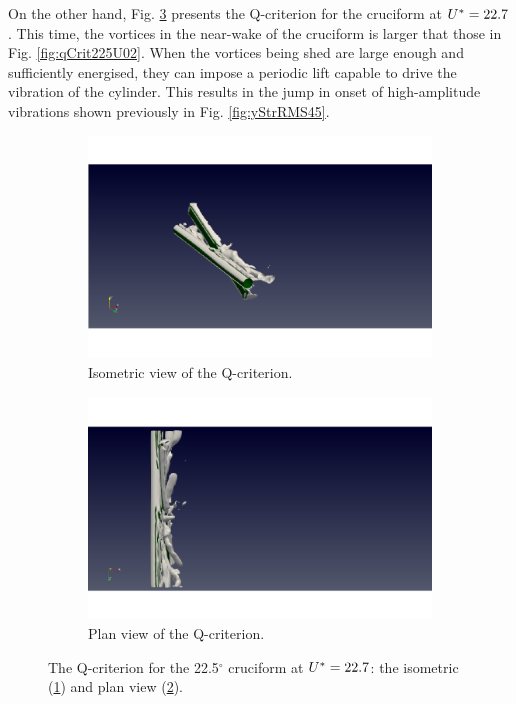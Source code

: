 \documentclass[oneside]{utmthesis}
\begin{document}
On the other hand, Fig. \ref{fig:qCrit225U10} presents the Q-criterion for the \angtw{} cruciform at $U^{*} = 22.7$. This time, the vortices in the near-wake of the cruciform is larger that those in Fig. \ref{fig:qCrit225U02}. When the vortices being shed are large enough and sufficiently energised, they can impose a periodic lift capable to drive the vibration of the cylinder. This results in the jump in onset of high-amplitude vibrations shown previously in Fig. \ref{fig:yStrRMS45}.

\begin{figure}[H]
  \centering
  \begin{subfigure}[h]{0.48\textwidth}
    \includegraphics[width=\textwidth,trim={1.5cm 0 3cm 0},clip]{figs/qIso225U10}
    \caption{Isometric view of the Q-criterion.}
    \label{fig:qIso225U10}
  \end{subfigure}
  \hfill
  \begin{subfigure}[h]{0.48\textwidth}
    \includegraphics[width=\textwidth,trim={1.5cm 0 3cm 0},clip]{figs/qTop225U10}
    \caption{Plan view of the Q-criterion.}
    \label{fig:qTop225U10}
  \end{subfigure}

  \caption{The Q-criterion for the 22.5$^{\circ}$ cruciform at $U^{*} = 22.7$: the isometric (\ref{fig:qIso225U10}) and plan view (\ref{fig:qTop225U10}).} \label{fig:qCrit225U10}
\end{figure}
\end{document}
